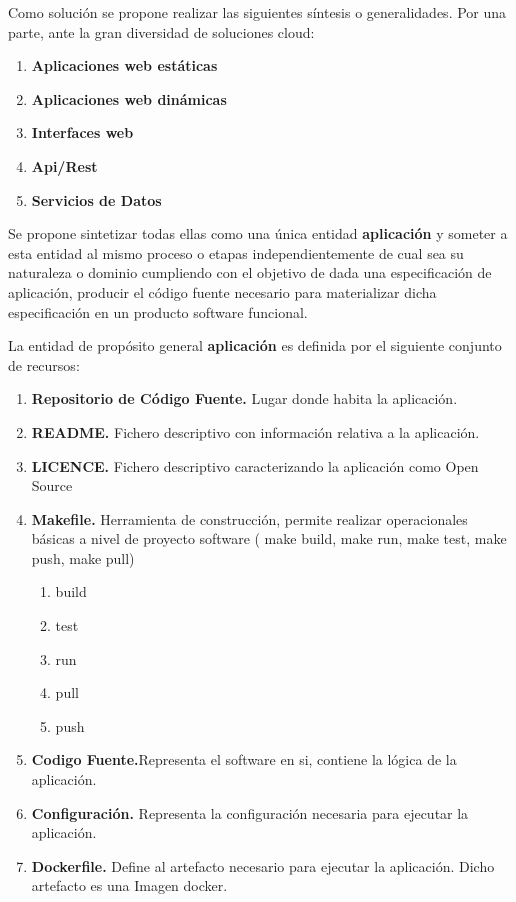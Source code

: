 \documentclass[a4paper,11pt]{book}
\begin{document}
Como solución se propone realizar las siguientes síntesis o generalidades.  Por una parte, ante la gran diversidad de soluciones cloud: 

\begin{enumerate}
\item \textbf{ Aplicaciones web estáticas }
\item \textbf{ Aplicaciones web dinámicas}
\item \textbf{ Interfaces web }
\item \textbf{ Api/Rest }
\item \textbf{ Servicios de Datos }
\end{enumerate}

Se propone sintetizar todas ellas  como una única  entidad \textbf{aplicación} y  someter a esta entidad al mismo proceso o etapas independientemente de cual sea su naturaleza o dominio cumpliendo con el objetivo de dada una especificación de aplicación, producir el código fuente necesario para materializar dicha especificación en un producto software funcional. 



La entidad de propósito general \textbf{aplicación} es definida por el siguiente conjunto de recursos:    

\begin{enumerate}
\item \textbf{ Repositorio de Código Fuente. } Lugar donde habita la aplicación. 
\item \textbf{ README.} Fichero descriptivo con información relativa a  la aplicación. 
\item \textbf{ LICENCE. }Fichero descriptivo caracterizando la aplicación como Open Source 
\item \textbf{ Makefile.} Herramienta  de construcción, permite realizar operacionales básicas a nivel de proyecto software ( make build, make run, make test, make push, make pull)

  \begin{enumerate}[label*=\arabic*.]
    \item build
    \item test
   	\item run
   	\item pull
   	\item push	
  \end{enumerate}
  
  
\item \textbf{ Codigo Fuente.}Representa el software en si, contiene la lógica de la aplicación.  
\item \textbf{ Configuración.} Representa la configuración necesaria para ejecutar la aplicación. 
\item \textbf{ Dockerfile.} Define al artefacto necesario para ejecutar la aplicación. Dicho artefacto es una Imagen docker. 
\end{enumerate}
\end{document}
